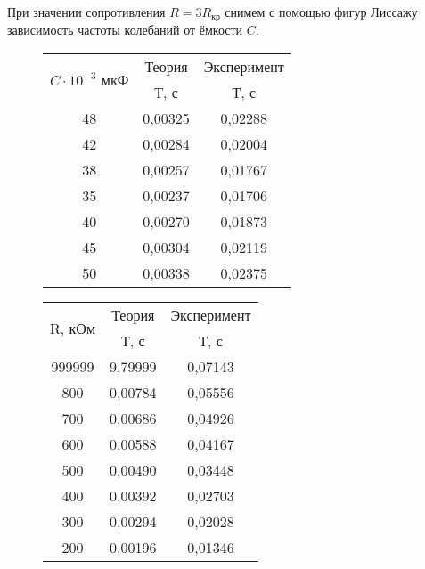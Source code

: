При значении сопротивления $R = 3R_{кр}$ снимем с помощью фигур Лиссажу зависимость частоты колебаний от ёмкости $C$. \\

\begin{figure}[H]
	\begin{minipage}[b]{0.45\linewidth}
		\centering
			\begin{tabular}{|c|c|c|}
				\hline
				\multirow{2}{*}{$C \cdot 10^{-3}$ мкФ} & Теория  & Эксперимент \\ \cline{2-3} 
				& Т, с    & Т, с        \\ \hline
				48                               & 0,00325 & 0,02288     \\ \hline
				42                               & 0,00284 & 0,02004     \\ \hline
				38                               & 0,00257 & 0,01767     \\ \hline
				35                               & 0,00237 & 0,01706     \\ \hline
				40                               & 0,00270 & 0,01873     \\ \hline
				45                               & 0,00304 & 0,02119     \\ \hline
				50                               & 0,00338 & 0,02375     \\ \hline
			\end{tabular}
	\end{minipage}
	\begin{minipage}[b]{0.45\linewidth}
				\centering
		\begin{tabular}{|c|c|c|}
			\hline
			\multirow{2}{*}{R,   кОм} & Теория  & Эксперимент \\ \cline{2-3} 
			& Т, с    & Т, с        \\ \hline
			999999                    & 9,79999 & 0,07143     \\ \hline
			800                       & 0,00784 & 0,05556     \\ \hline
			700                       & 0,00686 & 0,04926     \\ \hline
			600                       & 0,00588 & 0,04167     \\ \hline
			500                       & 0,00490 & 0,03448     \\ \hline
			400                       & 0,00392 & 0,02703     \\ \hline
			300                       & 0,00294 & 0,02028     \\ \hline
			200                       & 0,00196 & 0,01346     \\ \hline
		\end{tabular}
	\end{minipage}	
\end{figure}

